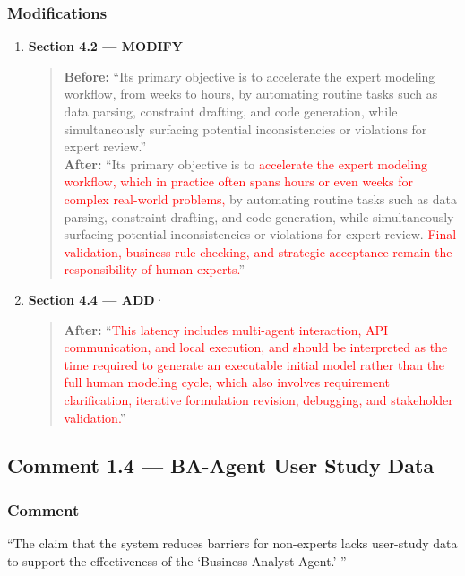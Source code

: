 \documentclass[11pt,a4paper]{article}
\begin{document}
\subsubsection{Modifications}
\begin{enumerate}
\item \textbf{Section 4.2 --- MODIFY} \label{resp:r1.3-modifications}
\begin{quote}
\textbf{Before:} ``Its primary objective is to accelerate the expert modeling workflow, from weeks to hours, by automating routine tasks such as data parsing, constraint drafting, and code generation, while simultaneously surfacing potential inconsistencies or violations for expert review.''\\[4pt]
\textbf{After:} ``Its primary objective is to \textcolor{red}{accelerate the expert modeling workflow, which in practice often spans hours or even weeks for complex real-world problems,} by automating routine tasks such as data parsing, constraint drafting, and code generation, while simultaneously surfacing potential inconsistencies or violations for expert review. \textcolor{red}{Final validation, business-rule checking, and strategic acceptance remain the responsibility of human experts.}''
\end{quote}

\item \textbf{Section 4.4 --- ADD}·
\begin{quote}
\textbf{After:} ``\textcolor{red}{This latency includes multi-agent interaction, API communication, and local execution, and should be interpreted as the time required to generate an executable initial model rather than the full human modeling cycle, which also involves requirement clarification, iterative formulation revision, debugging, and stakeholder validation.}''
\end{quote}
\end{enumerate}


\subsection{Comment 1.4 --- BA-Agent User Study Data}\label{subsec:comment1.4}

\subsubsection{Comment}
``The claim that the system reduces barriers for non-experts lacks user-study data to support the effectiveness of the `Business Analyst Agent.' ''
\end{document}
